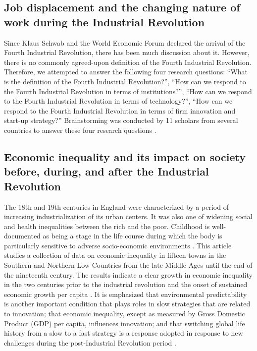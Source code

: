 \documentclass{article}
\begin{document}
\subsection{Job displacement and the changing nature of work during the Industrial Revolution}

Since Klaus Schwab and the World Economic Forum declared the arrival of the Fourth Industrial Revolution, there has been much discussion about it. However, there is no commonly agreed-upon definition of the Fourth Industrial Revolution. Therefore, we attempted to answer the following four research questions: “What is the definition of the Fourth Industrial Revolution?”, “How can we respond to the Fourth Industrial Revolution in terms of institutions?”, “How can we respond to the Fourth Industrial Revolution in terms of technology?”, “How can we respond to the Fourth Industrial Revolution in terms of firm innovation and start-up strategy?” Brainstorming was conducted by 11 scholars from several countries to answer these four research questions \cite{Lee2018HowTR}.

\subsection{Economic inequality and its impact on society before, during, and after the Industrial Revolution}

The 18th and 19th centuries in England were characterized by a period of increasing industrialization of its urban centers. It was also one of widening social and health inequalities between the rich and the poor. Childhood is well-documented as being a stage in the life course during which the body is particularly sensitive to adverse socio-economic environments \cite{Newman2016DedicatedFO}. This article studies a collection of data on economic inequality in fifteen towns in the Southern and Northern Low Countries from the late Middle Ages until the end of the nineteenth century. The results indicate a clear growth in economic inequality in the two centuries prior to the industrial revolution and the onset of sustained economic growth per capita \cite{Ryckbosch2016EconomicIA}. It is emphasized that environmental predictability is another important condition that plays roles in slow strategies that are related to innovation; that economic inequality, except as measured by Gross Domestic Product (GDP) per capita, influences innovation; and that switching global life history from a slow to a fast strategy is a response adopted in response to new challenges during the post-Industrial Revolution period \cite{Chen2019EnvironmentalUE}.
\end{document}
